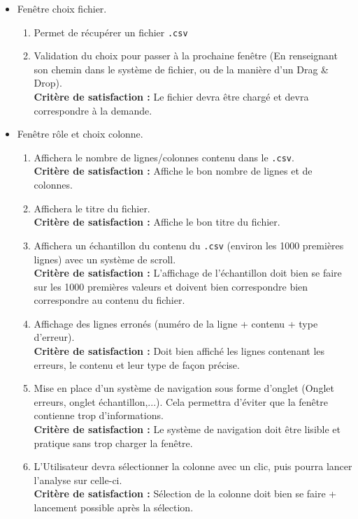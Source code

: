 \begin{itemize}
			\item Fenêtre choix fichier.
				\begin{enumerate}
					\item Permet de récupérer un fichier \lstinline!.csv! 
					\item Validation du choix pour passer à la prochaine fenêtre (En renseignant son chemin dans le système de fichier, ou de la manière d'un Drag \& Drop). \\
					\textbf{Critère de satisfaction : }Le fichier devra être chargé  et devra correspondre à la demande.
				\end{enumerate}
			\item Fenêtre rôle et choix colonne.		
				\begin{enumerate}
				\item Affichera le nombre de lignes/colonnes contenu dans le \lstinline!.csv!.\\
				\textbf{Critère de satisfaction : } Affiche le bon nombre de lignes et de colonnes.
				\item Affichera le titre du fichier. \\
				\textbf{Critère de satisfaction : } Affiche le bon titre du fichier.
				\item Affichera un échantillon du contenu du \lstinline!.csv! (environ les 1000 premières lignes) avec un système de scroll.\\ 
				\textbf{Critère de satisfaction : } L'affichage de l'échantillon doit bien se faire sur les 1000 premières valeurs et doivent bien correspondre bien correspondre au contenu du fichier. 
				\item Affichage des lignes erronés (numéro de la ligne + contenu + type d'erreur).\\
				 \textbf{Critère de satisfaction : } Doit bien affiché les lignes contenant les erreurs, le contenu et leur type de façon précise.
				\item Mise en place d'un système de navigation sous forme d'onglet (Onglet erreurs, onglet échantillon,...). Cela permettra d'éviter que la fenêtre contienne trop d'informations. \\
				\textbf{Critère de satisfaction : } Le système de navigation doit être lisible et pratique sans trop charger la fenêtre.
				\item L'Utilisateur devra sélectionner la colonne avec un clic, puis pourra lancer l'analyse sur celle-ci. \\
				\textbf{Critère de satisfaction : } Sélection de la colonne doit bien se faire + lancement possible après la sélection.

\end{enumerate}
\end{itemize}
